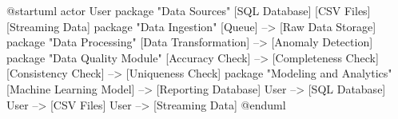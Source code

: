 @startuml
actor User
package "Data Sources" {
  [SQL Database]
  [CSV Files]
  [Streaming Data]
}
package "Data Ingestion" {
  [Queue] --> [Raw Data Storage]
}
package "Data Processing" {
  [Data Transformation] --> [Anomaly Detection]
}
package "Data Quality Module" {
  [Accuracy Check] --> [Completeness Check]
  [Consistency Check] --> [Uniqueness Check]
}
package "Modeling and Analytics" {
  [Machine Learning Model] --> [Reporting Database]
}
User --> [SQL Database]
User --> [CSV Files]
User --> [Streaming Data]
@enduml
